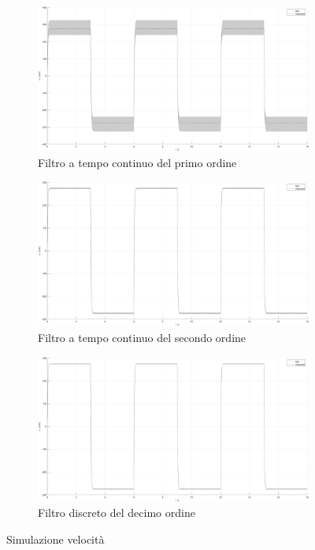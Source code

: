 \documentclass[a4paper, 11pt]{article}
\begin{document}
\begin{figure}[H]
    \centering
    \begin{subfigure}{0.3\linewidth}
        \centering
        \includegraphics[width=\linewidth]{./Images/speed_filter_1.png}
        \caption{Filtro a tempo continuo del primo ordine}
        \label{Lab5:first}
    \end{subfigure}
    \hfill
    \begin{subfigure}{0.3\linewidth}
        \centering
        \includegraphics[width=\linewidth]{./Images/speed_filter_2.png}
        \caption{Filtro a tempo continuo del secondo ordine}
        \label{Lab5:second}
    \end{subfigure}
        \hfill
    \begin{subfigure}{0.3\linewidth}
        \centering
        \includegraphics[width=\linewidth]{./Images/speed_filter_3.png}
        \caption{Filtro discreto del decimo ordine}
        \label{Lab5:discrete}
    \end{subfigure}
    \caption{Simulazione velocità}
\end{figure}
\end{document}
